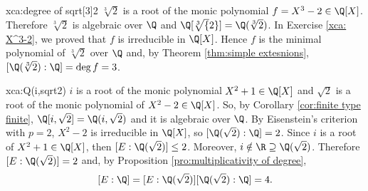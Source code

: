 \begin{sol}{xca:degree of sqrt[3]2}
    $\sqrt[3]{2}$ is a root of the monic polynomial $f=X^3-2\in \Q[X]$.
    Therefore $\sqrt[3]{2}$ is algebraic over $\Q$ 
    and $\Q[\sqrt[3]{2}]=\Q(\sqrt[3]{2})$.
    In Exercise \ref{xca: X^3-2}, we proved that
    $f$ is irreducible in $\Q[X]$.
    Hence $f$ is the minimal polynomial of $\sqrt[3]{2}$
    over $\Q$ and, by Theorem \ref{thm:simple extesnions},
    $[\Q(\sqrt[3]{2}):\Q]=\deg f=3$.
\end{sol}

\begin{sol}{xca:Q(i,sqrt2)}
    $i$ is a root of the monic polynomial $X^2+1\in\Q[X]$
    and $\sqrt{2}$ is a root of the monic polynomial of 
    $X^2-2\in\Q[X]$.
    So, by Corollary \ref{cor:finite type finite},
     $\Q[i,\sqrt{2}]=\Q(i,\sqrt{2})$ and it is algebraic over $\Q$.
    By Eisenstein's criterion with $p=2$,
    $X^2-2$ is irreducible in $\Q[X]$, so 
    $[\Q(\sqrt{2}):\Q]=2$.
    Since $i$ is a root of $X^2+1\in\Q[X]$,
    then $[E:\Q(\sqrt{2})]\leq 2$.
    Moreover, $i\notin \R\supseteq \Q(\sqrt{2})$.
    Therefore $[E:\Q(\sqrt{2})]=2$ and,
    by Proposition \ref{pro:multiplicativity of degree},
    \[
    [E:\Q]=[E:\Q(\sqrt{2})][\Q(\sqrt{2}):\Q]=4.
    \]
\end{sol}


